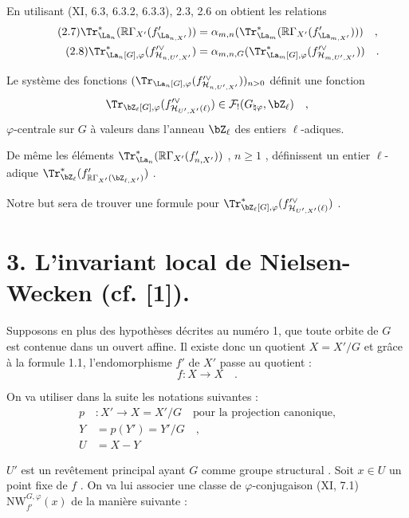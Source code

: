 En utilisant (XI, 6.3, 6.3.2, 6.3.3), 2.3, 2.6 on obtient les relations
\begin{align}
\tag{2.7} \Tr^*_{\La_n}(\mathbb{R}\Gamma_{X'}(f'_{\La_{n,X'}})) &= \alpha_{m,n}(\Tr^*_{\La_m}(\mathbb{R}\Gamma_{X'}(f'_{\La_{m,X'}}))) \quad , \\
\tag{2.8} \Tr^*_{\La_n[G],\varphi}(f'^\vee_{\mathcal{H}_{n,U',X'}}) &= \alpha_{m,n,G}(\Tr^*_{\La_m[G],\varphi}(f'^\vee_{\mathcal{H}_{m,U',X'}})) \quad .
\end{align}

Le système des fonctions $(\Tr_{\La_n[G],\varphi}(f'^\vee_{\mathcal{H}_{n,U',X'}}))_{n>0}$ définit une fonction
\[
\Tr_{\bZ_\ell[G],\varphi}(f'^\vee_{\mathcal{H}_{U',X'}(\ell)}) \in \mathcal{F}_!(G_{\natural\varphi}, \bZ_\ell) \quad ,
\]
$\varphi$-centrale sur $G$ à valeurs dans l'anneau $\bZ_\ell$ des entiers $\ell$-adiques.

De même les éléments $\Tr^*_{\La_n}(\mathbb{R}\Gamma_{X'}(f'_{n,X'}))$ , $n \geq 1$ , définissent un entier $\ell$-adique $\Tr^*_{\bZ_\ell}(f'_{\mathbb{R}\Gamma_{X'}(\bZ_{\ell,X'})})$ .

Notre but sera de trouver une formule pour $\Tr^*_{\bZ_\ell[G],\varphi}(f'^\vee_{\mathcal{H}_{U',X'}(\ell)})$ .


\section*{3. L'invariant local de Nielsen-Wecken (cf. [1]).}
Supposons en plus des hypothèses décrites au numéro 1, que toute orbite de $G$ est contenue dans un ouvert affine. Il existe donc un quotient $X = X'/G$ et grâce à la formule 1.1, l'endomorphisme $f'$ de $X'$ passe au quotient :
\[
f : X \longrightarrow X \quad .
\]

On va utiliser dans la suite les notations suivantes :
\begin{align*}
p &: X' \longrightarrow X = X'/G \quad
\text{pour la projection canonique,} \\
Y &= p(Y') = Y'/G \quad , \\
U &= X - Y
\end{align*}

$U'$ est un revêtement principal ayant $G$ comme groupe structural . Soit $x \in U$ un point fixe de $f$ . On va lui associer une classe de $\varphi$-conjugaison (XI, 7.1) $\mathrm{NW}_{f'}^{G,\varphi}(x)$ de la manière suivante :

